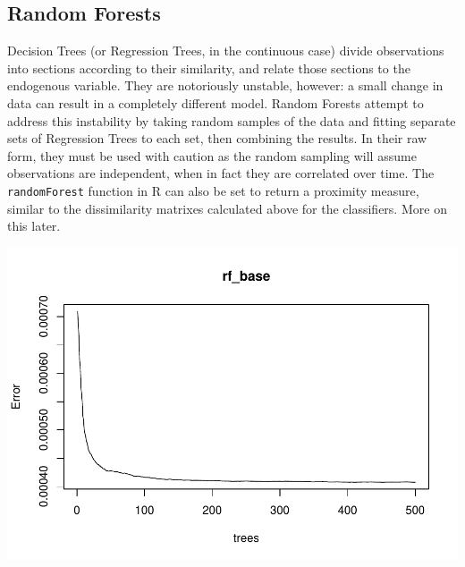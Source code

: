 \documentclass[]{article}
\newenvironment{Shaded}{\begin{snugshade}}{\end{snugshade}}
\newcommand{\KeywordTok}[1]{\textcolor[rgb]{0.13,0.29,0.53}{\textbf{#1}}}
\newcommand{\DataTypeTok}[1]{\textcolor[rgb]{0.13,0.29,0.53}{#1}}
\newcommand{\StringTok}[1]{\textcolor[rgb]{0.31,0.60,0.02}{#1}}
\newcommand{\OperatorTok}[1]{\textcolor[rgb]{0.81,0.36,0.00}{\textbf{#1}}}
\newcommand{\NormalTok}[1]{#1}
\begin{document}
\subsection{Random Forests}\label{random-forests}

Decision Trees (or Regression Trees, in the continuous case) divide
observations into sections according to their similarity, and relate
those sections to the endogenous variable. They are notoriously
unstable, however: a small change in data can result in a completely
different model. Random Forests attempt to address this instability by
taking random samples of the data and fitting separate sets of
Regression Trees to each set, then combining the results. In their raw
form, they must be used with caution as the random sampling will assume
observations are independent, when in fact they are correlated over
time. The \texttt{randomForest} function in R can also be set to return
a proximity measure, similar to the dissimilarity matrixes calculated
above for the classifiers. More on this later.

\begin{Shaded}
\end{Shaded}

\includegraphics{Econometric_FX_Forecasting_files/figure-latex/rf-1.pdf}
\end{document}
